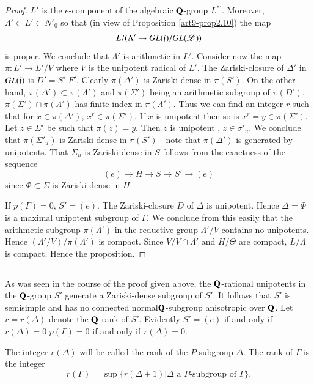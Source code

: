 \begin{proof}
$L'$ is the $e$-component of the algebraic $\mathbf{Q}$-group $L^{\ast'}$. Moreover, $\Lambda' \subset L' \subset N'_0$ so that (in view of Proposition \ref{art9-prop2.10}) the map
$$
L/ (\Lambda' \to GL (\mathfrak{f})/ GL (\mathscr{L}))
$$
is proper. We conclude that $\Lambda'$ is arithmetic in $L'$. Consider now the map $\pi: L' \to L'/ V$ where $V$ is the unipotent radical of $L'$. The Zariski-closure of $\Delta'$ in $GL(\mathfrak{f})$ is $D' = S'. F'$. Clearly $\pi(\Delta')$ is Zariski-dense in $\pi(S')$. On the other hand, $\pi (\Delta') \subset \pi (\Lambda')$ and $\pi (\Sigma')$ being an arithmetic subgroup of $\pi (D')$, $\pi (\Sigma') \cap \pi (\Lambda')$ has finite index in $\pi(\Lambda')$. Thus we can find an integer $r$ such that for $x \in \pi (\Delta')$, $x^r \in \pi (\Sigma')$. If $x$ is  unipotent then so is $x^r=y \in \pi (\Sigma')$. Let $z \in \Sigma'$ be such that $\pi(z) = y$. Then $z$ is unipotent \ie, $z \in \sigma'_u$. We conclude that $\pi(\Sigma'_u)$ is Zariski-dense in $\pi(S')$---note that $\pi (\Delta')$ is generated by unipotents. That $\Sigma_u$ is Zariski-dense in $S$ follows from the exactness of the sequence
$$
(e) \to H \to S \to S' \to (e)
$$
since $\Phi \subset \Sigma$ is Zariski-dense in $H$.
 
If $p(\Gamma) = 0$, $S' = (e)$. The Zariski-closure $D$ of $\Delta$ is unipotent. Hence $\Delta = \Phi$ is a maximal unipotent subgroup of $\Gamma$. We conclude from this easily that the arithmetic subgroup $\pi (\Lambda')$ in the reductive group $\Lambda'/V$ contains no unipotents. Hence $(\Lambda'/V)/\pi (\Lambda')$ is compact. Since $V/ V \cap \Lambda'$ and $H / \Theta$ are compact, $L/\Lambda$ is compact. Hence the proposition.
\end{proof}

\setcounter{subsection}{18}
\subsection{}\label{art9-subsec2.19}
As was seen in the course of the proof given above, the $\mathbf{Q}$-rational unipotents in the $\mathbf{Q}$-group $S'$ generate a Zariski-dense subgroup of $S'$. It follows that $S'$ is semisimple and has no connected normal\pageoriginale $\mathbf{Q}$-subgroup anisotropic over $\mathbf{Q}$. Let $r = r (\Delta)$ denote the $\mathbf{Q}$-rank of $S'$. Evidently $S' = (e)$ if and only if $r (\Delta) = 0$ \ie $p(\Gamma) = 0$ if and only if $r(\Delta) = 0$.

\setcounter{definition}{19}
\begin{definition}\label{art9-def2.20}
The integer $r(\Delta)$ will be called the rank of the $P$-subgroup $\Delta$. The rank of $\Gamma$ is the integer
$$
r (\Gamma) = \sup \{r (\Delta + 1) \big| \Delta \text{ a $P$-subgroup of } \Gamma\}.
$$
\end{definition}

